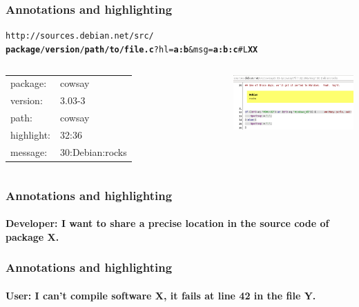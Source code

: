 \documentclass{beamer}
\begin{document}
\begin{frame}
  \frametitle{Annotations and highlighting}
  \texttt{http://sources.debian.net/src/\\
    \textbf{package}/\textbf{version}/\textbf{path/to/file.c}?hl=\textbf{a:b}\&msg=\textbf{a:b:c}\#L\textbf{XX}}
  \vspace{1cm}
  \pause
  \begin{columns}
    \begin{tabular}{ l l }
      package: & cowsay\\
      version: & 3.03-3\\
      path: & cowsay\\
      highlight: & 32:36\\
      message: & 30:Debian:rocks
    \end{tabular}
    \pause
    \includegraphics[width=7.5cm]{img/screenshot-hl.png}
  \end{columns}
\end{frame}

\begin{frame}
  \frametitle{Annotations and highlighting}
  \framesubtitle{\alert{Developer}: I want to share a precise
    location in the source code of package X.}
\end{frame}

\begin{frame}
  \frametitle{Annotations and highlighting}
  \framesubtitle{\alert{User}: I can't compile software X, it fails
    at line 42 in the file Y.}
\end{frame}
\end{document}
